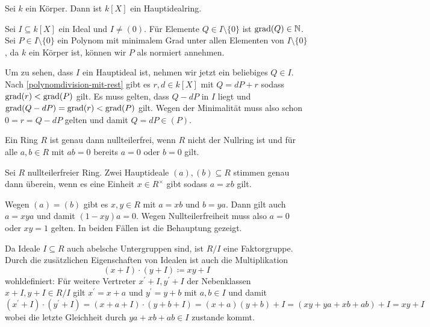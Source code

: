 \begin{satz}
  Sei \(k\) ein Körper. 
  Dann ist \(k[X]\) ein Hauptidealring.
\end{satz}

\begin{beweis}
  Sei \(I\subseteq k[X]\) ein Ideal und \(I\neq (0)\).
  Für Elemente \(Q\in I\setminus \{0\}\) ist \(\mathrm{grad}(Q)\in\mathbb{N}\).
  Sei \(P\in I\setminus\{0\}\) ein Polynom mit minimalem Grad unter allen Elementen von \(I\setminus\{0\}\), da \(k\) ein Körper ist, können wir \(P\) als normiert annehmen.

  Um zu sehen, dass \(I\) ein Hauptideal ist, nehmen wir jetzt ein beliebiges \(Q\in I\).
  Nach \ref{polynomdivision-mit-rest} gibt es \(r,d\in k[X]\) mit \(Q=dP+r\) sodass \(\mathrm{grad}(r)<\mathrm{grad}(P)\) gilt.
  Es muss gelten, dass \(Q-dP\) in \(I\) liegt und \(\mathrm{grad}(Q-dP)=\mathrm{grad}(r)<\mathrm{grad}(P)\) gilt. Wegen der Minimalität muss also schon \(0=r=Q-dP\) gelten und damit \(Q=dP\in(P)\).
\end{beweis}

\begin{lemma}
  Ein Ring \(R\) ist genau dann nullteilerfrei, wenn \(R\) nicht der Nullring ist und für alle \(a,b\in R\) mit \(ab=0\) bereits \(a=0\) oder \(b=0\) gilt.
\end{lemma}

\begin{bemerkung}
  Sei \(R\) nullteilerfreier Ring. Zwei Hauptideale \((a),(b)\subseteq R\) stimmen genau dann überein, wenn es eine Einheit \(x\in R^\times\) gibt sodass \(a=xb\) gilt.
\end{bemerkung}

\begin{beweis}
  Wegen \((a)=(b)\) gibt es \(x,y\in R\) mit \(a=xb\) und \(b=ya\).
  Dann gilt auch \(a=xya\) und damit \((1-xy)a=0\).
  Wegen Nullteilerfreiheit muss also \(a=0\) oder \(xy=1\) gelten.
  In beiden Fällen ist die Behauptung gezeigt.
\end{beweis}

Da Ideale \(I\subseteq R\) auch abelsche Untergruppen sind,
ist \(R/I\) eine Faktorgruppe.
Durch die zusätzlichen Eigenschaften von Idealen ist auch die Multiplikation
\[
  (x+I)\cdot (y+I)\coloneq xy+I
\]
wohldefiniert: Für weitere Vertreter \(x^\prime+I, y^\prime+I\) der Nebenklassen \(x+I,y+I\in R/I\) gilt \(x^\prime=x+a\) und \(y^\prime=y+b\) mit \(a,b\in I\) und damit
\[
  (x^\prime+I)\cdot (y^\prime+I)=(x+a+I)\cdot (y+b+I)=(x+a)(y+b)+I=(xy+ya+xb+ab)+I=xy+I
\]
wobei die letzte Gleichheit durch \(ya+xb+ab\in I\) zustande kommt.

